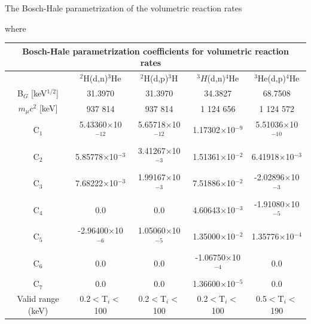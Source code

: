 {\noindent
The Bosch-Hale parametrization of the volumetric reaction rates~~\cite{bosch}

\indent
where

\begin{table}[h!]\small
  \noindent
  \centering
  \begin{tabular}{c c c c c}
    \multicolumn{5}{c}{Bosch-Hale parametrization coefficients for volumetric reaction rates~~\cite{bosch}}\\
    \hline
    \T\B& $^2$H(d,n)$^3$He & $^2$H(d,p)$^3$H & $^3H$(d,n)$^4$He & $^3$He(d,p)$^4$He\\
    \hline\hline
    B$_G$ [keV$^{1/2}$] \T& 31.3970 & 31.3970 & 34.3827   & 68.7508 \\
    $m_\mu c^2$ [keV]   \B& 937 814 & 937 814 & 1 124 656 & 1 124 572 \\
    \hline
    C$_1$\T& 5.43360$\times$10$^{-12}$  & 5.65718$\times$10$^{-12}$ & 1.17302$\times$10$^{-9}$  & 5.51036$\times$10$^{-10}$ \\ 
    C$_2$  & 5.85778$\times$10$^{-3}$   & 3.41267$\times$10$^{-3}$  & 1.51361$\times$10$^{-2}$  & 6.41918$\times$10$^{-3}$ \\
    C$_3$  & 7.68222$\times$10$^{-3}$   & 1.99167$\times$10$^{-3}$  & 7.51886$\times$10$^{-2}$  & -2.02896$\times$10$^{-3}$ \\
    C$_4$  & 0.0                        & 0.0                       & 4.60643$\times$10$^{-3}$  & -1.91080$\times$10$^{-5}$ \\
    C$_5$  & -2.96400$\times$10$^{-6}$  & 1.05060$\times$10$^{-5}$  & 1.35000$\times$10$^{-2}$  & 1.35776$\times$10$^{-4}$ \\
    C$_6$  & 0.0                        & 0.0                       & -1.06750$\times$10$^{-4}$ & 0.0 \\
    C$_7$\B& 0.0                      & 0.0                       & 1.36600$\times$10$^{-5}$  & 0.0 \\
    \hline
    Valid range (keV) \T\B& 0.2$<$T$_i<$100 & 0.2$<$T$_i<$100 & 0.2$<$T$_i<$100 & 0.5$<$T$_i<$190\\
    \hline
  \end{tabular}
  \label{table:rrParam}
\end{table}

}
